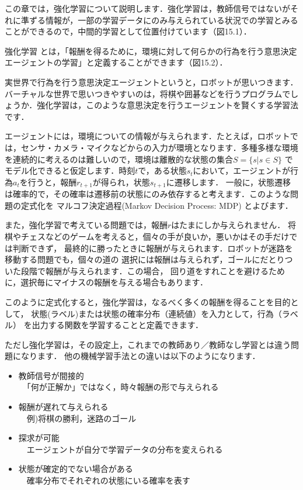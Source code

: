 
この章では，強化学習について説明します．強化学習は，教師信号ではないがそれに準ずる情報が，一部の学習データにのみ与えられている状況での学習とみることができるので，中間的学習として位置付けています（図15.1）．


強化学習
とは，「報酬を得るために，環境に対して何らかの行為を行う意思決定エージェントの学習」と定義することができます（図15.2）．

実世界で行為を行う意思決定エージェントというと，ロボットが思いつきます．
バーチャルな世界で思いつきやすいのは，将棋や囲碁などを行うプログラムでしょうか．強化学習は，このような意思決定を行うエージェントを賢くする学習法です．

エージェントには，環境についての情報が与えられます．たとえば，ロボットでは，センサ・カメラ・マイクなどからの入力が環境となります．多種多様な環境を連続的に考えるのは難しいので，環境は離散的な状態の集合$S=\{s|s \in S\}$
でモデル化できると仮定します．時刻$t$で，ある状態$s_t$において，エージェントが行為$a_t$を行うと，報酬$r_{t+1}$が得られ，状態$s_{t+1}$に遷移します．
一般に，状態遷移は確率的で，その確率は遷移前の状態にのみ依存すると考えます．このような問題の定式化を
マルコフ決定過程(Markov Decision Process: MDP)
とよびます．

また，強化学習で考えている問題では，報酬$r$はたまにしか与えられません．
将棋やチェスなどのゲームを考えると，個々の手が良いか，悪いかはその手だけでは判断できず，
最終的に勝ったときに報酬が与えられます．ロボットが迷路を移動する問題でも，個々の道の
選択には報酬は与えられず，ゴールにだとりついた段階で報酬が与えられます．この場合，
回り道をすれことを避けるために，選択毎にマイナスの報酬を与える場合もあります．

このように定式化すると，強化学習は，なるべく多くの報酬を得ることを目的として，
状態(ラベル)または状態の確率分布（連続値）を入力として，行為（ラベル）
を出力する関数を学習することと定義できます．

ただし強化学習は，その設定上，これまでの教師あり／教師なし学習とは違う問題になります．
他の機械学習手法との違いは以下のようになります．

\begin{itemize}
\item 教師信号が間接的\\
　「何が正解か」ではなく，時々報酬の形で与えられる
\item 報酬が遅れて与えられる\\
　例)将棋の勝利，迷路のゴール
\item 探求が可能\\
　エージェントが自分で学習データの分布を変えられる
\item 状態が確定的でない場合がある\\
　確率分布でそれぞれの状態にいる確率を表す
\end{itemize}

